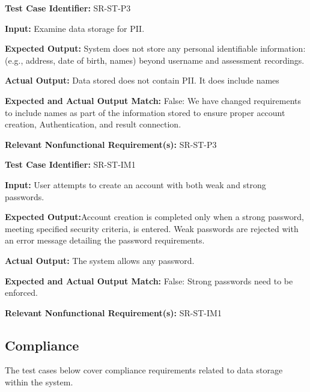 \documentclass[12pt, titlepage]{article}
\begin{document}
\begin{mdframed}[linewidth=0.5mm] \par
  \textbf{Test Case Identifier:} SR-ST-P3 \par
  \textbf{Input:} Examine data storage for PII. \par 
  \textbf{Expected Output:} System does not store any personal identifiable information: (e.g., address, date
  of birth, names) beyond username and assessment recordings. \par  
  \textbf{Actual Output:} Data stored does not contain PII. It does include names \par
  \textbf{Expected and Actual Output Match:} False: We have changed requirements to include names as part of the information stored to ensure proper account creation, 
  Authentication, and result connection. \par
  \textbf{Relevant Nonfunctional Requirement(s):} SR-ST-P3
\end{mdframed}

\begin{mdframed}[linewidth=0.5mm] \par
  \textbf{Test Case Identifier:} SR-ST-IM1 \par
  \textbf{Input:} User attempts to create an account with both weak and
  strong passwords. \par 
  \textbf{Expected Output:}Account creation is completed only when a strong password,
  meeting specified security criteria, is entered. Weak passwords are rejected with
  an error message detailing the password requirements. \par  
  \textbf{Actual Output:} The system allows any password. \par
  \textbf{Expected and Actual Output Match:} False: Strong passwords need to be enforced. \par
  \textbf{Relevant Nonfunctional Requirement(s):} SR-ST-IM1
\end{mdframed}

\newpage{}

\subsection{Compliance}
\hspace{2em}The test cases below cover compliance requirements related to data storage within the system. 
\end{document}
